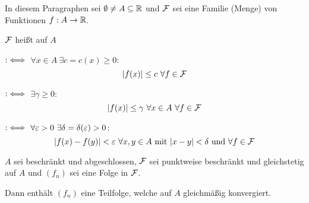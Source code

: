 \documentclass[a4paper,twoside,DIV15,BCOR12mm]{scrbook}
\begin{document}
In diesem Paragraphen sei $\emptyset \ne A \subseteq \mathbb{R}$ und $\mathcal{F}$ sei eine Familie (Menge) von Funktionen $f:A\to\mathbb{R}$.

\begin{definition}
$\mathcal{F}$ heißt auf $A$ 
\begin{liste}
\item {} $:\iff$ $\forall x\in A \ \exists c = c(x) \ge 0:$
\[|f(x)| \le c \ \forall f\in \mathcal{F} \]
\item {} $:\iff$ $\exists \gamma \ge 0: $
\[ |f(x)| \le \gamma  \ \forall x \in A \ \forall f\in \F \]
\item {} $:\iff$ $\forall \varepsilon > 0 \ \exists \delta = \delta(\varepsilon) > 0$:
\[ |f(x) - f(y)|<\ep \ \forall x,y \in A \text{ mit } |x-y| < \delta \text{ und } \forall f\in \F \]
\end{liste}
\end{definition}

\begin{satz*}
$A$ sei beschränkt und abgeschlossen, $\mathcal{F}$ sei punktweise beschränkt und gleichstetig auf $A$ und $(f_n)$ sei eine Folge in $\mathcal{F}$.

Dann enthält $(f_n)$ eine Teilfolge, welche auf $A$ gleichmäßig konvergiert.
\end{satz*}
\end{document}
